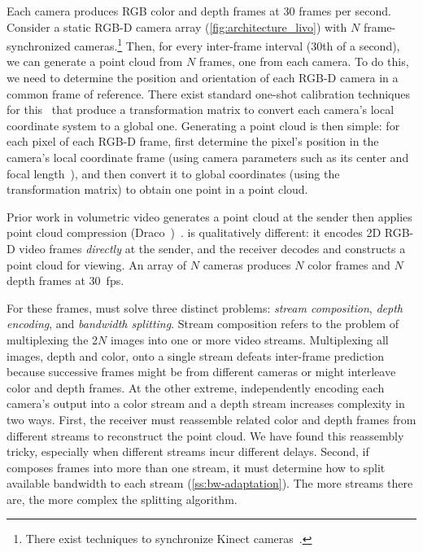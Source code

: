 %
%
Each camera produces RGB color and depth frames at 30 frames per second.
%
Consider a static RGB-D camera array (\cref{fig:architecture_livo}) with $N$ frame-synchronized cameras.\footnote{There exist techniques to synchronize Kinect cameras~\cite{kinect-sync}.}
%
Then, for every inter-frame interval (30th of a second), we can generate a point cloud from $N$ frames, one from each camera.
%
To do this, we need to determine the position and orientation of each RGB-D camera in a common frame of reference.
%
There exist standard one-shot calibration techniques for this~\cite{zhang-calib} that produce a transformation matrix to convert each camera's local coordinate system to a global one.
%
Generating a point cloud is then simple: for each pixel of each RGB-D frame, first determine the pixel's position in the camera's local coordinate frame (using camera parameters such as its center and focal length~\cite{metastream}), and then convert it to global coordinates (using the transformation matrix) to obtain one point in a point cloud.


%
Prior work in volumetric video generates a point cloud at the sender then applies point cloud compression (\eg Draco~\cite{draco})~\cite{livescan3d, metastream}.
%
\livo{} is qualitatively different: it encodes 2D RGB-D video frames \textit{directly} at the sender, and the receiver decodes and constructs a point cloud for viewing.
%
An array of $N$ cameras produces $N$ color frames and $N$ depth frames at 30~fps.

For these frames, \livo{} must solve three distinct problems: \textit{stream composition}, \textit{depth encoding}, and \textit{bandwidth splitting}.
%
Stream composition refers to the problem of multiplexing the 2$N$ images into one or more video streams.
%
Multiplexing all images, depth and color, onto a single stream defeats inter-frame prediction because successive frames might be from different cameras or might interleave color and depth frames.
%
At the other extreme, independently encoding each camera's output into a color stream and a depth stream increases complexity in two ways.
%
First, the receiver must reassemble related color and depth frames from different streams to reconstruct the point cloud.
%
We have found this reassembly tricky, especially when different streams incur different delays.
%
Second, if \livo{} composes frames into more than one stream, it must determine how to split available bandwidth to each stream (\cref{ss:bw-adaptation}).
%
The more streams there are, the more complex the splitting algorithm.

